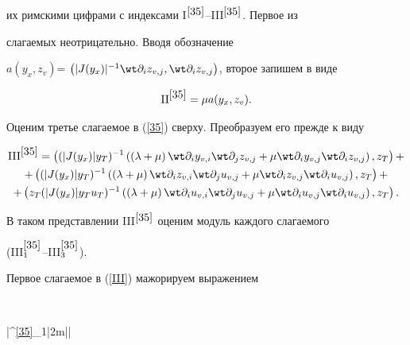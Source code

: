 их римскими цифрами с индексами I$^{\ref{35}}$--III$^{\ref{35}}$. Первое из


слагаемых неотрицательно. Вводя обозначение


$a(y_x,z_v)$= $\Scal{|J(y_x)|^{-1} \wt \partial_{i}z_{v,j}, \wt 


\partial_{i}z_{v,j}}$, второе запишем в виде


$$


{\mathrm{II}}^{\ref{35}} = \mu a(y_x,z_v).


$$


Оценим третье слагаемое в (\ref{35}) сверху. Преобразуем его прежде к виду


\begin{multline} 


\label{III}


{\mathrm{III}}^{\ref{35}} =\Scal{ ( |J(y_x)| y_T)^{-1}\left(


\left(\lambda+\mu \right) \wt \partial_{i}y_{v,i}\wt \partial_{j}z_{v,j}


+\mu \wt \partial_{i}y_{v,j}\wt \partial_{i}z_{v,j}


\right),z_T} +\\


+\Scal{( |J(y_x)| y_T)^{-1}\left(


\left(\lambda+\mu \right) \wt \partial_{i}z_{v,i}\wt \partial_{j}u_{v,j}


+\mu \wt \partial_{i}z_{v,j}\wt \partial_{i}u_{v,j}


\right),z_T} +\\


+\Scal{ z_T (|J(y_x)| y_T u_T)^{-1}\left(


\left(\lambda+\mu \right) \wt \partial_{i}u_{v,i}\wt \partial_{j}u_{v,j}


+\mu \wt \partial_{i}u_{v,j}\wt \partial_{i}u_{v,j}


\right),z_T}.


\end{multline}


В таком представлении III$^{\ref{35}}$ оценим модуль каждого слагаемого 


(III$^{\ref{35}}_1$--III$^{\ref{35}}_3$). 





Первое слагаемое в (\ref{III}) мажорируем выражением


$$


|{}^{\ref{35}}_1|\le 2m\max\bigg|\bigg|



